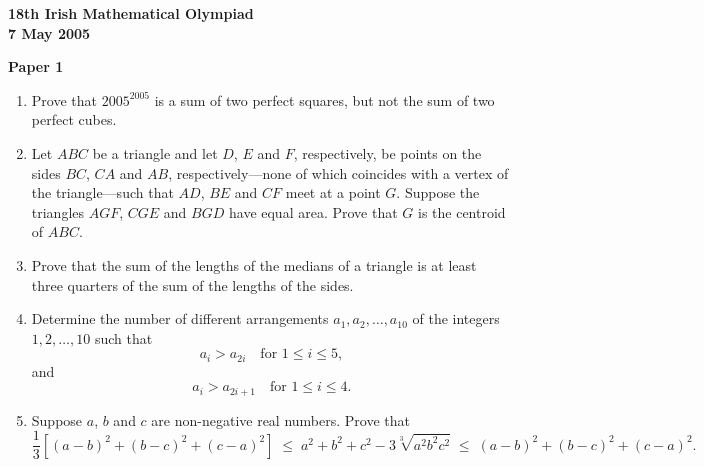 \documentclass[12pt]{article}
\begin{document}
\begin{center}
{\large\bfseries 18th Irish Mathematical Olympiad\\7 May 2005}
\end{center}
\bigskip\noindent\textbf{Paper 1}\bigskip
\begin{enumerate}
\item Prove that $2005^{2005}$ is a sum of two perfect squares, but not the sum of two perfect cubes.

\item Let $ABC$ be a triangle and let $D$, $E$ and $F$, respectively, be points on the sides $BC$, $CA$ and $AB$, respectively---none of which coincides with a vertex of the triangle---such that $AD$, $BE$ and $CF$ meet at a point $G$. Suppose the triangles $AGF$, $CGE$ and $BGD$ have equal area. Prove that $G$ is the centroid of $ABC$.

\item Prove that the sum of the lengths of the medians of a triangle is at least three quarters of the sum of the lengths of the sides.

\item Determine the number of different arrangements $a_1, a_2, \ldots, a_{10}$ of the integers $1, 2, \ldots, 10$ such that
\[
a_i > a_{2i} \quad \text{for } 1 \le i \le 5,
\]
and
\[
a_i > a_{2i+1} \quad \text{for } 1 \le i \le 4.
\]

\item Suppose $a$, $b$ and $c$ are non-negative real numbers. Prove that
\[
\frac{1}{3}\left[(a-b)^2 + (b-c)^2 + (c-a)^2\right]
\;\le\; a^2 + b^2 + c^2 - 3\sqrt[3]{a^2 b^2 c^2}
\;\le\; (a-b)^2 + (b-c)^2 + (c-a)^2.
\]
\end{enumerate}
\end{document}
